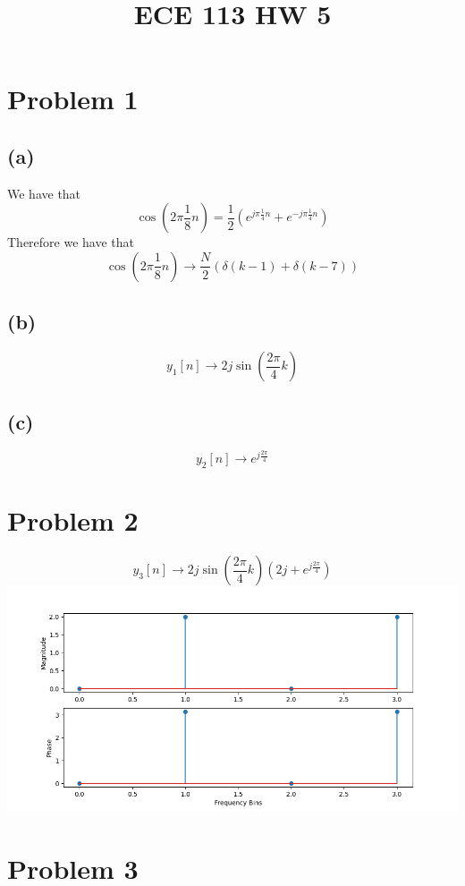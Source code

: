 
\title{ECE 113 HW 5}

\maketitle
\section*{Problem 1}
\subsection*{(a)}
We have that
$$\cos(2\pi\frac{1}{8}n)=\frac{1}{2}\left(e^{j\pi\frac{1}{4}n}+e^{-j\pi\frac{1}{4}n}\right)$$
Therefore we have that
$$\cos(2\pi\frac{1}{8}n)\to\boxed{\frac{N}{2}\left(\delta(k-1)+\delta(k-7)\right)}$$
\subsection*{(b)}
$$y_1[n]\to\boxed{2j\sin(\frac{2\pi}{4}k)}$$
\subsection*{(c)}
$$y_2[n]\to\boxed{e^{j\frac{2\pi}{4}}}$$
\section*{Problem 2}
$$y_3[n]\to\boxed{2j\sin(\frac{2\pi}{4}k)\left(2j+e^{j\frac{2\pi}{4}}\right)}$$
\includegraphics*[scale=0.5]{fig.png}
\section*{Problem 3}

